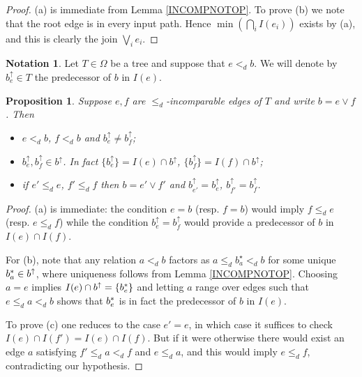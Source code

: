 \documentclass[a4paper,10pt
,draft
]{article}%
\numberwithin{equation}{section}
\numberwithin{figure}{section}
\newtheorem{proposition}[equation]{Proposition}%
\theoremstyle{definition} %
\newtheorem{notation}[equation]{Notation}%
\newcommand{\1}{\ensuremath{\mathbbm 1}}%
\begin{document}
\begin{proof}
	(a) is immediate from Lemma \ref{INCOMPNOTOP}.
	To prove (b) we note that
	the root edge is in every input path.
	Hence $\min (\bigcap_{i} I(e_i))$ exists by (a), 
	and this is clearly the join $\bigvee_i {e_i}$.
\end{proof}


\begin{notation}
	Let $T \in \Omega$ be a tree and suppose that $e <_d b$. We will denote by $b^{\uparrow}_e \in T$ the predecessor of $b$ in $I(e)$.
\end{notation}


\begin{proposition}\label{INPUTPREDECESSORPROP PROP}
Suppose $e,f$ are $\leq_d$-incomparable edges of $T$ and write $b= e \vee f$. Then
\begin{itemize}
\item [(a)] $e <_d b$, $f<_d b$ and $b^{\uparrow}_e \neq b^{\uparrow}_f$;
\item [(b)] $b^{\uparrow}_e, b^{\uparrow}_f \in b^{\uparrow}$. In fact $\{b^{\uparrow}_e\} = I(e) \cap b^{\uparrow}$,
$\{b^{\uparrow}_f\} = I(f) \cap b^{\uparrow}$;
\item[(c)] if $e' \leq_d e$, $f' \leq_d f$ then 
$b = e' \vee f'$ and $b^{\uparrow}_{e'} = b^{\uparrow}_{e}$, $b^{\uparrow}_{f'} = b^{\uparrow}_{f}$.
\end{itemize}
\end{proposition}


\begin{proof}
(a) is immediate: the condition $e = b$ (resp. $f = b$) would imply $f \leq_d e$ (resp. $e \leq_d f$)
while the condition $b^{\uparrow}_e = b^{\uparrow}_f$ would provide a predecessor of $b$ in $I(e) \cap I(f)$. 

For (b), note that any relation $a <_d b$ factors as 
$a \leq_d b^{\star}_a <_d b$ for some unique $b^{\**}_a \in b^{\uparrow}$, where uniqueness follows from Lemma \ref{INCOMPNOTOP}. Choosing $a=e$ implies $I(e) \cap b^{\uparrow} = \{b^{\**}_e\}$ and letting $a$ range over edges such that $e \leq_d a <_d b$ shows that $b^{\**}_e$ is in fact the predecessor of $b$ in $I(e)$.

To prove (c) one reduces to the case $e'=e$, in which case it suffices to check $I(e) \cap I(f') = I(e) \cap I(f)$. But if it were otherwise there would exist an edge $a$ satisfying
$f' \leq_d a <_d f$ and $e \leq_d a$, and this would imply $e \leq_d f$, contradicting our hypothesis.
\end{proof}
\end{document}
